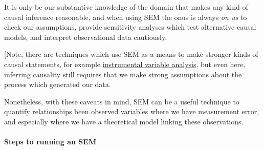 \documentclass[]{article}
\let\oldparagraph\paragraph
\renewcommand{\paragraph}[1]{\oldparagraph{#1}\mbox{}}
\begin{document}
It is only be our substantive knowledge of the domain that makes any kind of
causal inference reasonable, and when using SEM the onus is always \emph{on us} to
check our assumptions, provide sensitivity analyses which test alternative
causal models, and interpret observational data cautiously.

{[}Note, there are techniques which use SEM as a means to make stronger kinds of
causal statements, for example
\href{https://en.wikipedia.org/wiki/Instrumental_variable}{instrumental variable analysis},
but even here, inferring causality still requires that we make strong
assumptions about the process which generated our data.

Nonetheless, with these caveats in mind, SEM can be a useful technique to
quantify relationships been observed variables where we have measurement error,
and especially where we have a theoretical model linking these observations.

\hypertarget{steps-to-running-an-sem}{%
\paragraph{Steps to running an SEM}\label{steps-to-running-an-sem}}
\end{document}
